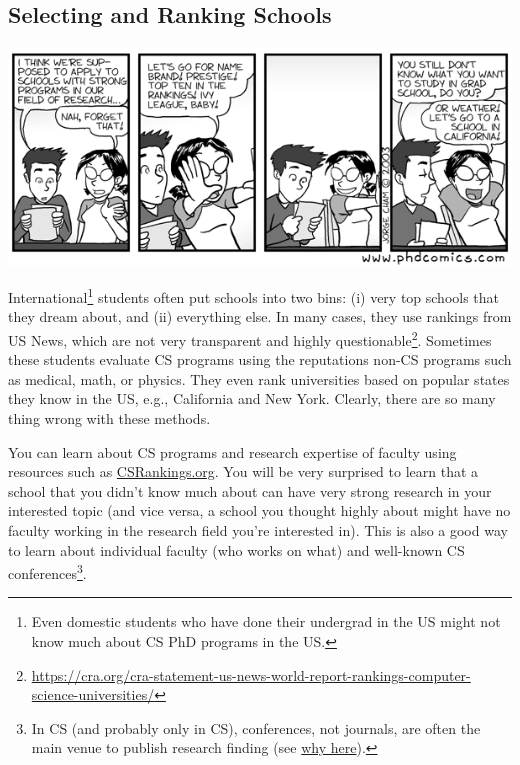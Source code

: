 \documentclass[oneside,11pt,dvipsnames]{book}
\begin{document}
\subsection{Selecting and Ranking Schools}\label{sec:selecting-ranking-schools}
\begin{center}
  \includegraphics[scale=0.5]{files/c1.png}
\end{center}

International\footnote{Even domestic students who have done their undergrad in the US might not know much about CS PhD programs in the US.} students often put schools into two bins: (i) very top schools that they dream about, and (ii) everything else.  In many cases, they use rankings from US News, which are not very transparent and highly questionable\footnote{\url{https://cra.org/cra-statement-us-news-world-report-rankings-computer-science-universities/}}.  Sometimes these students evaluate CS programs using the reputations non-CS programs such as medical, math, or physics.
They even rank universities based on popular states they know in the US, e.g., California and New York.  Clearly, there are so many thing wrong with these methods.

You can learn about CS programs and research expertise of faculty using resources such as \href{https://csrankings.org}{CSRankings.org}. You will be very surprised to learn that a school that you didn't know much about can have very strong research in your interested topic (and vice versa, a school you thought highly about might have no faculty working in the research field you're interested in). This is also a good way to learn about individual faculty (who works on what) and well-known CS conferences\footnote{In CS (and probably only in CS), conferences, not journals, are often the main venue to publish research finding (see \href{https://homes.cs.washington.edu/~mernst/advice/conferences-vs-journals.html}{why here}).}. %
\end{document}
